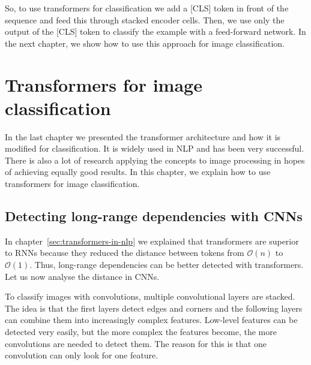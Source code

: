 \documentclass[a4paper]{scrartcl}
\let\stdsection\section
\renewcommand\section{\newpage\stdsection}
\begin{document}
    So, to use transformers for classification we add a [CLS] token in front of the sequence and feed this through stacked encoder cells.
    Then, we use only the output of the [CLS] token to classify the example with a feed-forward network.
    In the next chapter, we show how to use this approach for image classification.

    \clearpage



    \section{Transformers for image classification}\label{sec:transformers-for-image-classification}
    In the last chapter we presented the transformer architecture and how it is modified for classification.
    It is widely used in NLP and has been very successful.
    There is also a lot of research applying the concepts to image processing in hopes of achieving equally good results.
    In this chapter, we explain how to use transformers for image classification.

    \subsection{Detecting long-range dependencies with CNNs}
    In chapter~\ref{sec:transformers-in-nlp} we explained that transformers are superior to RNNs because they reduced the distance between tokens from $\mathcal{O}(n)$ to $\mathcal{O}(1)$.
    Thus, long-range dependencies can be better detected with transformers.
    Let us now analyse the distance in CNNs.

    To classify images with convolutions, multiple convolutional layers are stacked.
    The idea is that the first layers detect edges and corners and the following layers can combine them into increasingly complex features.
    Low-level features can be detected very easily, but the more complex the features become, the more convolutions are needed to detect them.
    The reason for this is that one convolution can only look for one feature.
\end{document}
